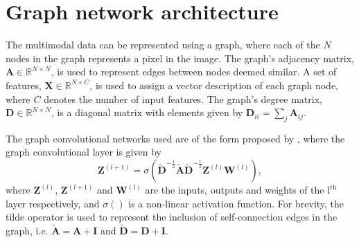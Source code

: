 \documentclass[
twocolumn,
]{ceurart}
\begin{document}
\section{Graph network architecture}
\label{sec::GraphNetworkArchitecture}
The multimodal data can be represented using a graph, where each of the $N$ nodes in the graph represents a pixel in the image.
The graph's adjacency matrix, $\mathbf{A}\in\mathbb{R}^{N\times N}$, is used to represent edges between nodes deemed similar.
A set of features, $\mathbf{X}\in\mathbb{R}^{N\times C}$, is used to assign a vector description of each graph node, where $C$ denotes the number of input features.
The graph's degree matrix, $\mathbf{D}\in\mathbb{R}^{N\times N}$, is a diagonal matrix with elements given by $\mathbf{D}_{ii}=\sum_j\mathbf{A}_{ij} $.

The graph convolutional networks used are of the form proposed by \cite{Kipf2017}, where the graph convolutional layer is given by
\begin{equation}
    \mathbf{Z}^{(l+1)}=\sigma\left(\tilde{\mathbf{D}}^{-\frac{1}{2}}\tilde{\mathbf{A}}\tilde{\mathbf{D}}^{-\frac{1}{2}}\mathbf{Z}^{(l)}\boldsymbol{W}^{(l)}\right),
\label{eq::gcn_layer}
\end{equation}
where $\mathbf{Z}^{(l)}$, $\mathbf{Z}^{(l+1)}$ and $\boldsymbol{W}^{(l)}$ are the inputs, outputs and weights of the $\textrm{l}^\textrm{th}$ layer respectively, and $\sigma()$ is a non-linear activation function.
For brevity, the tilde operator is used to represent the inclusion of self-connection edges in the graph, i.e. $\tilde{\mathbf{A}}=\mathbf{A}+\mathbf{I}$ and $\tilde{\mathbf{D}}=\mathbf{D}+\mathbf{I}$.
\end{document}
